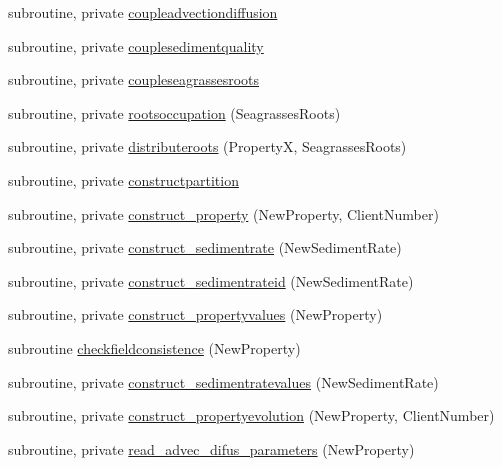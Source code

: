 \begin{DoxyCompactItemize}
\item 
subroutine, private \mbox{\hyperlink{namespacemodulesedimentproperties_a7337c30e5645edde83be4dae7d323f3b}{coupleadvectiondiffusion}}
\item 
subroutine, private \mbox{\hyperlink{namespacemodulesedimentproperties_ab1ad9fb8e7d7a22675312273d0b5abc5}{couplesedimentquality}}
\item 
subroutine, private \mbox{\hyperlink{namespacemodulesedimentproperties_ab7687e8a644768320a332dacba7eb257}{coupleseagrassesroots}}
\item 
subroutine, private \mbox{\hyperlink{namespacemodulesedimentproperties_ac9dd7bcf2f966e31f868dc3dc7a2cc13}{rootsoccupation}} (Seagrasses\+Roots)
\item 
subroutine, private \mbox{\hyperlink{namespacemodulesedimentproperties_ab83ce67b0749c96200f2b82879c0b349}{distributeroots}} (PropertyX, Seagrasses\+Roots)
\item 
subroutine, private \mbox{\hyperlink{namespacemodulesedimentproperties_a25b9b3491582d3d95d7501a1a79de02d}{constructpartition}}
\item 
subroutine, private \mbox{\hyperlink{namespacemodulesedimentproperties_ab01eb007762b8ce8366245977a153ea9}{construct\+\_\+property}} (New\+Property, Client\+Number)
\item 
subroutine, private \mbox{\hyperlink{namespacemodulesedimentproperties_a945018b7c1fcfbb5687c6021d5636530}{construct\+\_\+sedimentrate}} (New\+Sediment\+Rate)
\item 
subroutine, private \mbox{\hyperlink{namespacemodulesedimentproperties_af77439b27c476526490c3dafac1f3411}{construct\+\_\+sedimentrateid}} (New\+Sediment\+Rate)
\item 
subroutine, private \mbox{\hyperlink{namespacemodulesedimentproperties_a63773e38287296de2a4e2baec3bfe034}{construct\+\_\+propertyvalues}} (New\+Property)
\item 
subroutine \mbox{\hyperlink{namespacemodulesedimentproperties_aed9da5330d31cd4f61d7b60492c4d0ad}{checkfieldconsistence}} (New\+Property)
\item 
subroutine, private \mbox{\hyperlink{namespacemodulesedimentproperties_a6a52cd2ecac4c72aa40426e7ed1e0616}{construct\+\_\+sedimentratevalues}} (New\+Sediment\+Rate)
\item 
subroutine, private \mbox{\hyperlink{namespacemodulesedimentproperties_a0062c792fb1ce4d0c7dbe3c701104971}{construct\+\_\+propertyevolution}} (New\+Property, Client\+Number)
\item 
subroutine, private \mbox{\hyperlink{namespacemodulesedimentproperties_ae4b16a3890a8718b83545926394da139}{read\+\_\+advec\+\_\+difus\+\_\+parameters}} (New\+Property)

\end{DoxyCompactItemize}
